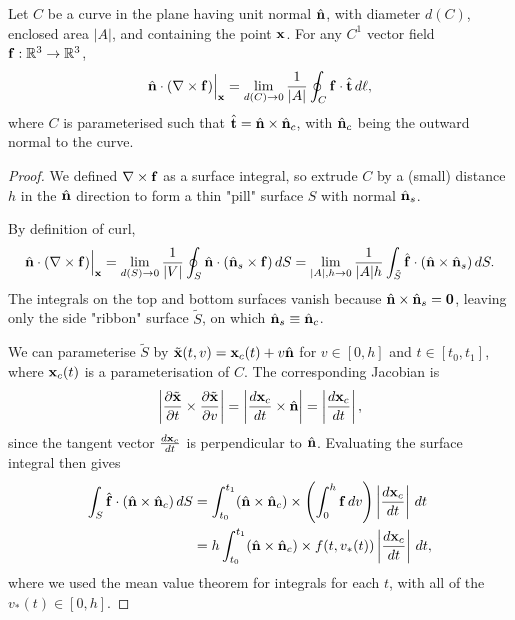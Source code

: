 \documentclass[10pt, a4paper]{article}
\begin{document}
\begin{lemma}
    Let $C$ be a curve in the plane having unit normal $\hat{\mbf{n}}$,
    with diameter $d(C)$,
    enclosed area $|A|$,
    and containing the point $\mbf{x}$.
    For any $C ^ {1}$ vector field $\mbf{f} : \R ^ 3 \to \R ^ 3$,
    \[
    \hat{\mbf{n}} \cdot(\bnabla \times \mbf{f})\Bigr\rvert_{\mbf{x}} = \lim_{d(C) \to 0}\frac{1}{|A|}\oint_{C}\mbf{f} \cdot \hat{\mbf{t}}\,d\ell,
    \]
    where $C$ is parameterised such that $\hat{\mbf{t}} = \hat{\mbf{n}} \times \hat{\mbf{n}}_{c}$,
    with $\hat{\mbf{n}}_c$ being the outward normal to the curve.

    \begin{proof}
        We defined $\bnabla \times \mbf{f}$ as a surface integral,
        so extrude $C$ by a
        (small)
        distance $h$ in the $\hat{\mbf{n}}$ direction to form a thin
        "pill"
        surface $S$ with normal $\hat{\mbf{n}}_{s}$.

        By definition of curl,
        \[
        \hat{\mbf{n}} \cdot (\bnabla \times \mbf{f})\Bigr\rvert_{\mbf{x}} = \lim_{d(S) \to 0}\frac{1}{|V|}\oint_{S}\hat{\mbf{n}} \cdot (\hat{\mbf{n}}_{s} \times \mbf{f})\,dS = \lim_{|A|, h \to 0}\frac{1}{|A|h}\int_{\tilde{S}}\hat{\mbf{f}} \cdot (\hat{\mbf{n}} \times \hat{\mbf{n}}_s)\,dS.
        \]
        The integrals on the top and bottom surfaces vanish because $\hat{\mbf{n}} \times \hat{\mbf{n}}_s = \mbf{0}$,
        leaving only the side
        "ribbon"
        surface $\tilde{S}$,
        on which $\hat{\mbf{n}}_{s} \equiv \hat{\mbf{n}}_{c}$.

        We can parameterise $\tilde{S}$ by $\tilde{\mbf{x}}(t, v) = \mbf{x}_{c}(t) + v\hat{\mbf{n}}$ for $v \in [0, h]$ and $t \in [t_0, t_1]$,
        where $\mbf{x}_{c}(t)$ is a parameterisation of $C$.
        The corresponding Jacobian is
        \[
        \left|\pd[\tilde{\mbf{x}}]{t} \times \pd[\tilde{\mbf{x}}]{v}\right| = \left|\frac{d\mbf{x}_{c}}{dt} \times \hat{\mbf{n}}\right| = \left|\frac{d\mbf{x}_c}{dt}\right|,
        \]
        since the tangent vector $\frac{d\mbf{x}_{c}}{dt}$ is perpendicular to $\hat{\mbf{n}}$.
        Evaluating the surface integral then gives
        \begin{align*}
            \int_{S}\hat{\mbf{f}} \cdot(\hat{\mbf{n}} \times \hat{\mbf{n}}_{c})\,dS &= \int_{t_0}^{t_1}(\hat{\mbf{n}} \times \hat{\mbf{n}}_{c}) \times \left(\int_{0}^{h}\mbf{f}\,dv\right)\left|\frac{d\mbf{x}_c}{dt}\right|\,dt \\
            &= h\int_{t_0}^{t_1}(\hat{\mbf{n}} \times \hat{\mbf{n}}_{c}) \times f(t, v_{*}(t))\left|\frac{d\mbf{x}_c}{dt}\right|\,dt,
        \end{align*}
        where we used the mean value theorem for integrals for each $t$,
        with all of the $v_{*}(t) \in [0, h]$.


\end{proof}
\end{lemma}
\end{document}
